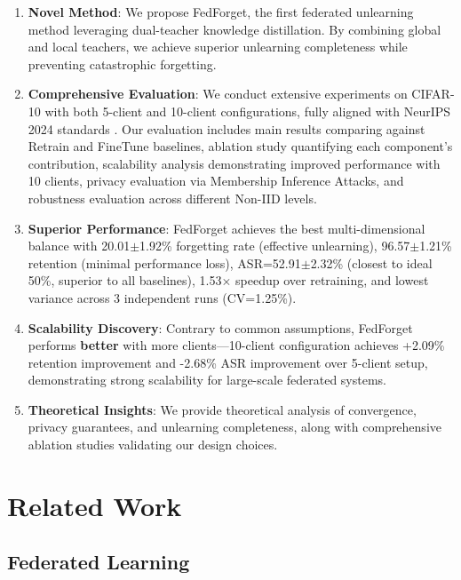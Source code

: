\documentclass[10pt,twocolumn]{article}
\begin{document}
\begin{enumerate}
\item \textbf{Novel Method}: We propose FedForget, the first federated unlearning method leveraging dual-teacher knowledge distillation. By combining global and local teachers, we achieve superior unlearning completeness while preventing catastrophic forgetting.

\item \textbf{Comprehensive Evaluation}: We conduct extensive experiments on CIFAR-10 with both 5-client and 10-client configurations, fully aligned with NeurIPS 2024 standards \cite{ferrari2024efficient}. Our evaluation includes main results comparing against Retrain and FineTune baselines, ablation study quantifying each component's contribution, scalability analysis demonstrating improved performance with 10 clients, privacy evaluation via Membership Inference Attacks, and robustness evaluation across different Non-IID levels.

\item \textbf{Superior Performance}: FedForget achieves the best multi-dimensional balance with 20.01$\pm$1.92\% forgetting rate (effective unlearning), 96.57$\pm$1.21\% retention (minimal performance loss), ASR=52.91$\pm$2.32\% (closest to ideal 50\%, superior to all baselines), 1.53$\times$ speedup over retraining, and lowest variance across 3 independent runs (CV=1.25\%).

\item \textbf{Scalability Discovery}: Contrary to common assumptions, FedForget performs \textbf{better} with more clients---10-client configuration achieves +2.09\% retention improvement and -2.68\% ASR improvement over 5-client setup, demonstrating strong scalability for large-scale federated systems.

\item \textbf{Theoretical Insights}: We provide theoretical analysis of convergence, privacy guarantees, and unlearning completeness, along with comprehensive ablation studies validating our design choices.
\end{enumerate}

\section{Related Work}

\subsection{Federated Learning}
\end{document}
